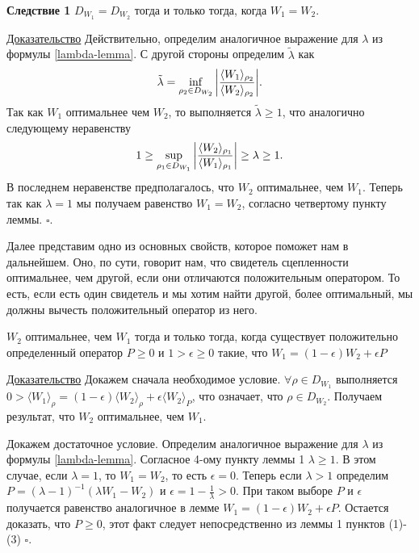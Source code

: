 \textbf{Следствие 1} $D_{W_1} = D_{W_2}$ тогда и только тогда, когда $W_1 = W_2$.

\underline{Доказательство} Действительно, определим аналогичное выражение для $\lambda$ из формулы \ref{lambda-lemma}. С другой стороны определим $\tilde \lambda$ как
\begin{equation}
    \tilde \lambda = \inf_{\rho_2 \in D_{W_2}} \abs{\frac{\langle W_1 \rangle_{\rho_2}}{\langle W_2 \rangle_{\rho_2}}}.
\end{equation}
Так как $W_1$ оптимальнее чем $W_2$, то выполняется $\tilde \lambda \geq 1$, что аналогично следующему неравенству
\begin{equation}
    1 \geq \sup_{\rho_1 \in D_{W_1}}
    \abs{\frac{\langle W_2 \rangle_{\rho_1}}{\langle W_1 \rangle_{\rho_1}}} \geq \lambda \geq 1.
\end{equation}
В последнем неравенстве предполагалось, что $W_2$ оптимальнее, чем $W_1$. Теперь так как $\lambda = 1$ мы получаем равенство $W_1 = W_2$, согласно  четвертому пункту леммы. $\square$.

Далее представим одно из основных свойств, которое поможет нам в дальнейшем. Оно, по сути, говорит нам, что свидетель сцепленности оптимальнее, чем другой, если они отличаются положительным оператором. То есть, если есть один свидетель и мы хотим найти другой, более оптимальный, мы должны вычесть положительный оператор из него.

\begin{lemma}
    $W_2$ оптимальнее, чем $W_1$ тогда и только тогда, когда существует положительно определенный оператор $P \geq 0$ и $1 > \epsilon \geq 0$ такие, что $W_1 = (1 - \epsilon)W_2 + \epsilon P$
\end{lemma}

\underline{Доказательство} Докажем сначала необходимое условие. $\forall \rho \in D_{W_1}$ выполняется $0 > \langle W_1 \rangle_{\rho} = (1-\epsilon) \langle W_2 \rangle_{\rho} + \epsilon \langle W_2 \rangle_{P}$, что означает, что $\rho \in D_{W_2}$. Получаем результат, что $W_2$ оптимальнее, чем $W_1$.

Докажем достаточное условие. Определим аналогичное выражение для $\lambda$ из формулы \ref{lambda-lemma}. Согласное 4-ому пункту леммы 1 $\lambda \geq 1$. В этом случае, если $\lambda = 1$, то $W_1 = W_2$, то есть $\epsilon = 0$. Теперь если $\lambda >1$ определим $P = (\lambda - 1)^{-1}(\lambda W_1 - W_2)$ и $\epsilon = 1-\frac{1}{\lambda} > 0$. При таком выборе $P$ и $\epsilon$ получается равенство аналогичное в лемме $W_1 = (1 - \epsilon)W_2 + \epsilon P$. Остается доказать, что $P \geq 0$, этот факт следует непосредственно из леммы 1 пунктов (1)-(3) $\square$.

